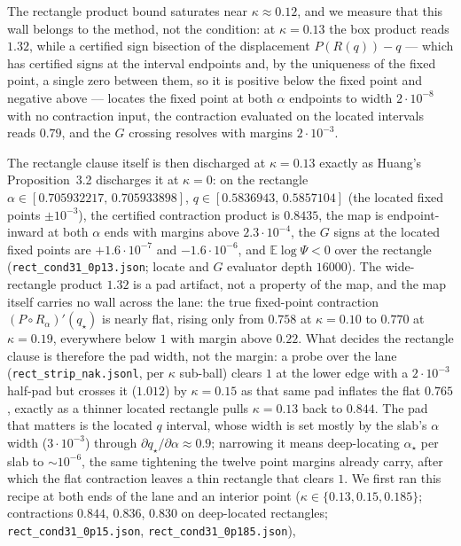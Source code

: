 \documentclass[11pt]{article}
\theoremstyle{remark}
\newcommand{\E}{\mathbb{E}}
\begin{document}
The rectangle product bound saturates near $\kappa\approx0.12$, and
we measure that this wall belongs to the method, not the condition:
at $\kappa=0.13$ the box product reads $1.32$, while a certified sign
bisection of the displacement $P(R(q))-q$ --- which has certified signs at the interval endpoints and, by
the uniqueness of the fixed point, a single zero between them, so it
is positive below the fixed point and negative above --- locates the fixed point at both $\alpha$
endpoints to width $2\cdot10^{-8}$ with no contraction input, the
contraction evaluated on the located intervals reads $0.79$, and the
$G$ crossing resolves with margins $2\cdot10^{-3}$.

The rectangle clause itself is then discharged at $\kappa=0.13$
exactly as Huang's Proposition~3.2 discharges it at $\kappa=0$: on
the rectangle $\alpha\in[0.705932217,\,0.705933898]$,
$q\in[0.5836943,\,0.5857104]$ (the located fixed points
$\pm10^{-3}$), the certified contraction product is $0.8435$, the
map is endpoint-inward at both $\alpha$ ends with margins above
$2.3\cdot10^{-4}$, the $G$ signs at the located fixed points are
$+1.6\cdot10^{-7}$ and $-1.6\cdot10^{-6}$, and $\E\log\Psi<0$
over the rectangle (\texttt{rect\_cond31\_0p13.json}; locate and
$G$ evaluator depth $16000$).  The wide-rectangle product $1.32$ is a
pad artifact, not a property of the map, and the map itself carries
no wall across the lane: the true fixed-point contraction
$(P\circ R_\alpha)'(q_\star)$ is nearly flat, rising only from
$0.758$ at $\kappa=0.10$ to $0.770$ at $\kappa=0.19$, everywhere
below $1$ with margin above $0.22$.  What decides the rectangle
clause is therefore the pad width, not the margin: a probe over the
lane (\texttt{rect\_strip\_nak.jsonl}, per $\kappa$ sub-ball) clears
$1$ at the lower edge with a $2\cdot10^{-3}$ half-pad but crosses it
($1.012$) by $\kappa=0.15$ as that same pad inflates the flat
$0.765$, exactly as a thinner located rectangle pulls $\kappa=0.13$
back to $0.844$.  The pad that matters is the located $q$ interval,
whose width is set mostly by the slab's $\alpha$ width
($3\cdot10^{-3}$) through $\partial q_\star/\partial\alpha\approx0.9$;
narrowing it means deep-locating $\alpha_\star$ per slab to
$\sim10^{-6}$, the same tightening the twelve point margins already
carry, after which the flat contraction leaves a thin rectangle that
clears $1$.  We first ran this recipe at both ends of the lane and an interior
point ($\kappa\in\{0.13,0.15,0.185\}$; contractions $0.844$, $0.836$,
$0.830$ on deep-located rectangles;
\texttt{rect\_cond31\_0p15.json}, \texttt{rect\_cond31\_0p185.json}),
\end{document}
